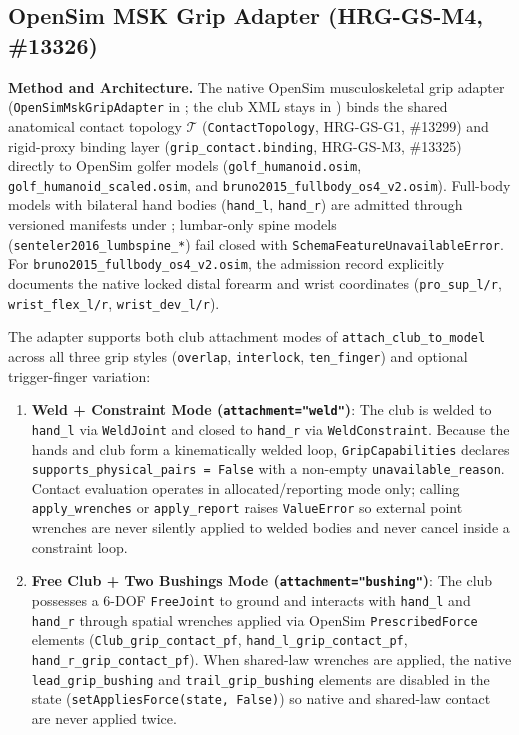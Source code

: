 \documentclass[11pt,a4paper]{article}
\begin{document}
\subsection{OpenSim MSK Grip Adapter (HRG-GS-M4, \#13326)}
\textbf{Method and Architecture.}
The native OpenSim musculoskeletal grip adapter (\texttt{OpenSimMskGripAdapter} in
; the club XML stays in ) binds the shared anatomical contact
topology $\mathcal{T}$ (\texttt{ContactTopology}, HRG-GS-G1, \#13299) and rigid-proxy binding layer
(\texttt{grip\_contact.binding}, HRG-GS-M3, \#13325) directly to OpenSim golfer models
(\texttt{golf\_humanoid.osim}, \texttt{golf\_humanoid\_scaled.osim}, and \texttt{bruno2015\_fullbody\_os4\_v2.osim}).
Full-body models with bilateral hand bodies (\texttt{hand\_l}, \texttt{hand\_r}) are admitted through
versioned manifests under ; lumbar-only spine models
(\texttt{senteler2016\_lumbspine\_*}) fail closed with \texttt{SchemaFeatureUnavailableError}.
For \texttt{bruno2015\_fullbody\_os4\_v2.osim}, the admission record explicitly documents the native
locked distal forearm and wrist coordinates (\texttt{pro\_sup\_l/r}, \texttt{wrist\_flex\_l/r},
\texttt{wrist\_dev\_l/r}).

The adapter supports both club attachment modes of \texttt{attach\_club\_to\_model} across all three
grip styles (\texttt{overlap}, \texttt{interlock}, \texttt{ten\_finger}) and optional trigger-finger
variation:
\begin{enumerate}
\item \textbf{Weld + Constraint Mode (\texttt{attachment="weld"})}: The club is welded to \texttt{hand\_l}
via \texttt{WeldJoint} and closed to \texttt{hand\_r} via \texttt{WeldConstraint}. Because the hands and
club form a kinematically welded loop, \texttt{GripCapabilities} declares
\texttt{supports\_physical\_pairs = False} with a non-empty \texttt{unavailable\_reason}. Contact evaluation
operates in allocated/reporting mode only; calling \texttt{apply\_wrenches} or \texttt{apply\_report}
raises \texttt{ValueError} so external point wrenches are never silently applied to welded bodies and never
cancel inside a constraint loop.
\item \textbf{Free Club + Two Bushings Mode (\texttt{attachment="bushing"})}: The club possesses a
6-DOF \texttt{FreeJoint} to ground and interacts with \texttt{hand\_l} and \texttt{hand\_r} through
spatial wrenches applied via OpenSim \texttt{PrescribedForce} elements (\texttt{Club\_grip\_contact\_pf},
\texttt{hand\_l\_grip\_contact\_pf}, \texttt{hand\_r\_grip\_contact\_pf}). When shared-law wrenches are
applied, the native \texttt{lead\_grip\_bushing} and \texttt{trail\_grip\_bushing} elements are disabled
in the state (\texttt{setAppliesForce(state, False)}) so native and shared-law contact are never applied
twice.
\end{enumerate}
\end{document}
